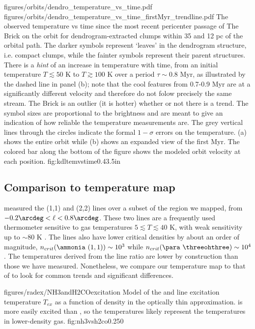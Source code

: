\FigureTwo
{figures/orbits/dendro_temperature_vs_time.pdf}
{figures/orbits/dendro_temperature_vs_time_firstMyr_trendline.pdf}
{The observed temperature vs time since the most recent pericenter passage of
The Brick on the \citet{Kruijssen2015a} orbit for dendrogram-extracted clumps within
35 \kms and 12 pc of the orbital path.  The darker symbols represent `leaves'
in the dendrogram structure, i.e. compact clumps, while the fainter symbols
represent their parent structures. There is a \emph{hint} of an 
increase in temperature with time, from an initial temperature $T\lesssim50$ K
to $T\gtrsim100$ K over a period $\tau\sim0.8$ Myr, as illustrated by the
dashed line in panel (b); note that the cool features from 0.7-0.9 Myr are
at a significantly different velocity and therefore do not folow precisely the same
stream.  The Brick is an outlier (it is hotter) whether or not there is a
trend.  The symbol sizes are proportional to the \para \threetwoone brightness
and are meant to give
an indication of how reliable the temperature measurements are.  The grey
vertical lines through the circles indicate the formal $1-\sigma$ errors on the
temperature.
(a) shows the entire orbit
while (b) shows an expanded
view of the first Myr.  The colored bar along the bottom of the figure shows the
modeled orbit velocity at each position.}
{fig:kdltemvstime}{0.4}{3.5in}

\subsection{Comparison to \citet{Ott2014a} \ammonia temperature map}
\label{sec:ammoniacompare}
\citet{Ott2014a} measured the \ammonia (1,1) and (2,2) lines over a subset of the
region we mapped, from $-0.2\arcdeg < \ell < 0.8\arcdeg$.  These two lines are
a frequently
used thermometer sensitive to gas temperatures $5 \lesssim T \lesssim 40$ K,
with weak sensitivity up to $\sim80$ K \citep[][Figure 1]{Mangum2013a}.  The
\ammonia lines also have lower critical densities by about an order of
magnitude, $n_{crit}(\textrm{\ammonia}~(1,1))\sim10^3$ \percc while $n_{crit}(\para~
\threeohthree)\sim10^4$ \percc \citep[Figure
\ref{fig:nh3vsh2co};][]{Shirley2015a}.  The temperatures derived from the
\ammonia line ratio are lower by construction than those we have
measured.  Nonetheless, we compare our temperature map to that of
\citet{Ott2014a} to look for common trends and significant differences.

\Figure
{figures/radex/NH3andH2COexcitation}
{Model of the \ammonia and \para line excitation temperature $T_{ex}$ as a function
of density in the optically thin approximation.   \ammonia is more easily
excited than \para, so the \ammonia temperatures likely represent the
temperatures in lower-density gas.}
{fig:nh3vsh2co}{0.25}{0}

